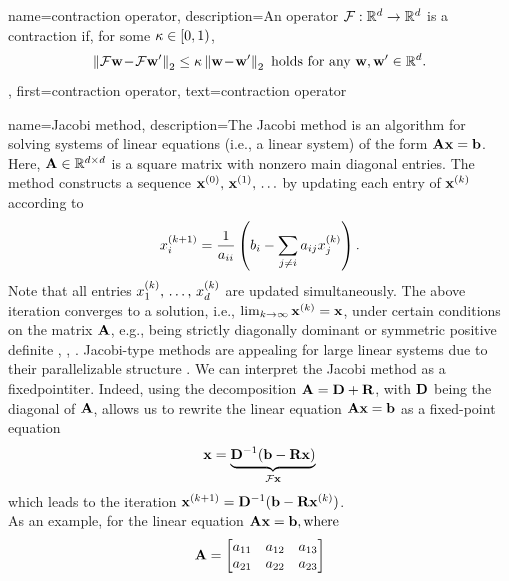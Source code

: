 {name={contraction operator},
	description={An operator $\mathcal{F}: \mathbb{R}^{d} \rightarrow \mathbb{R}^{d}$ 
		is a contraction if, for some $\kappa \in [0,1)$,
		\begin{equation} 
			\nonumber
			\left\Vert { \mathcal{F}{\bf w}\!-\!\mathcal{F}{\bf w}'} \right\Vert_{2}  \leq  \kappa	\left\Vert {{\bf w}\!-\!{\bf w}'} \right\Vert_{2} \mbox{ holds for any } {\bf w},{\bf w}' \in \mathbb{R}^{d}.
		\end{equation}},
	first={contraction operator},
	text={contraction operator}
}

{name={Jacobi method},
	description={The Jacobi method is an \gls{algorithm}  
		for solving systems of linear equations (i.e., a linear system) of the form ${\bf A}{\bf x}= \mathbf{b}$.  
		Here, ${\bf A} \in \mathbb{R}^{d \times d}$ is a square \gls{matrix} with 
		nonzero main diagonal entries. The method constructs a sequence ${\bf x}^{(0)}, \,{\bf x}^{(1)}, \,\ldots$ 
		by updating each entry of $\mathbf{x}^{(k)}$ according to 
		\[
		x_i^{(k+1)} = \frac{1}{a_{ii}} \left( b_i - \sum_{j \neq i} a_{ij} x_j^{(k)} \right).
		\]
		Note that all entries $x^{(k)}_{1}, \,\ldots, \,x^{(k)}_{d}$ are updated simultaneously.
		The above iteration converges to a solution, i.e., $\lim_{k \rightarrow \infty} {\bf x}^{(k)}={\bf x}$, 
		under certain conditions on the \gls{matrix} ${\bf A}$, e.g., being strictly 
		diagonally dominant or symmetric positive  definite \cite{GolubVanLoanBook}, \cite{Horn91}, \cite{StrangLinAlg2016}. 
		Jacobi-type methods are appealing for large linear systems due to their parallelizable structure \cite{ParallelDistrBook}.
		We can interpret the Jacobi method as a \gls{fixedpointiter}. Indeed, using the decomposition ${\bf A} = {\bf D} + {\bf R}$, with ${\bf D}$ being the 
		diagonal of ${\bf A}$, allows us to rewrite the linear equation ${\bf A} {\bf x} = {\bf b}$ as a fixed-point equation  
		\[
		\mathbf{x} = \underbrace{{\bf D}^{-1}(\mathbf{b} - {\bf R} \mathbf{x})}_{\mathcal{F} {\bf x}}
		\]
		which leads to the iteration ${\bf x}^{(k+1)} = {\bf D}^{-1}(\mathbf{b} - {\bf R} {\bf x}^{(k)})$.
		\\
		As an example, for the linear equation ${\bf A} \mathbf{x} = \mathbf{b}, \text{where}$ 
		 \[
		 {\bf A} = \begin{bmatrix}
		 	a_{11} & a_{12} & a_{13} \\
		 	a_{21} & a_{22} & a_{23} \\

\end{bmatrix}\]}}
